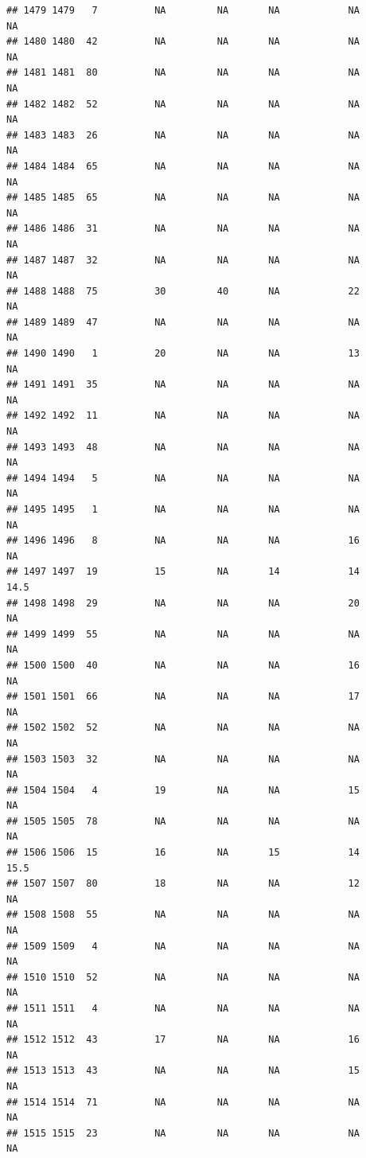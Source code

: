 \documentclass[man]{apa6}
\begin{document}
\begin{verbatim}
## 1479 1479   7          NA         NA       NA            NA       NA
## 1480 1480  42          NA         NA       NA            NA       NA
## 1481 1481  80          NA         NA       NA            NA       NA
## 1482 1482  52          NA         NA       NA            NA       NA
## 1483 1483  26          NA         NA       NA            NA       NA
## 1484 1484  65          NA         NA       NA            NA       NA
## 1485 1485  65          NA         NA       NA            NA       NA
## 1486 1486  31          NA         NA       NA            NA       NA
## 1487 1487  32          NA         NA       NA            NA       NA
## 1488 1488  75          30         40       NA            22       NA
## 1489 1489  47          NA         NA       NA            NA       NA
## 1490 1490   1          20         NA       NA            13       NA
## 1491 1491  35          NA         NA       NA            NA       NA
## 1492 1492  11          NA         NA       NA            NA       NA
## 1493 1493  48          NA         NA       NA            NA       NA
## 1494 1494   5          NA         NA       NA            NA       NA
## 1495 1495   1          NA         NA       NA            NA       NA
## 1496 1496   8          NA         NA       NA            16       NA
## 1497 1497  19          15         NA       14            14     14.5
## 1498 1498  29          NA         NA       NA            20       NA
## 1499 1499  55          NA         NA       NA            NA       NA
## 1500 1500  40          NA         NA       NA            16       NA
## 1501 1501  66          NA         NA       NA            17       NA
## 1502 1502  52          NA         NA       NA            NA       NA
## 1503 1503  32          NA         NA       NA            NA       NA
## 1504 1504   4          19         NA       NA            15       NA
## 1505 1505  78          NA         NA       NA            NA       NA
## 1506 1506  15          16         NA       15            14     15.5
## 1507 1507  80          18         NA       NA            12       NA
## 1508 1508  55          NA         NA       NA            NA       NA
## 1509 1509   4          NA         NA       NA            NA       NA
## 1510 1510  52          NA         NA       NA            NA       NA
## 1511 1511   4          NA         NA       NA            NA       NA
## 1512 1512  43          17         NA       NA            16       NA
## 1513 1513  43          NA         NA       NA            15       NA
## 1514 1514  71          NA         NA       NA            NA       NA
## 1515 1515  23          NA         NA       NA            NA       NA

\end{verbatim}
\end{document}
